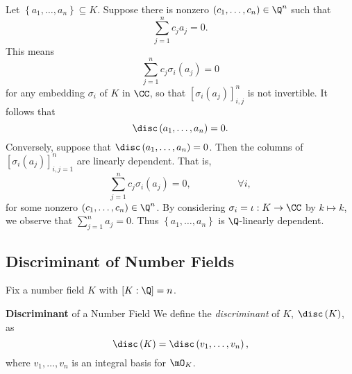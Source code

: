 \documentclass[pmath441]{subfiles}
\begin{document}
    \np Let $\left\lbrace a_1,\ldots,a_n \right\rbrace\subseteq K$. Suppose there is nonzero $\left( c_1,\ldots,c_n \right)\in\Q^n$ such that
    \begin{equation*}
        \sum^{n}_{j=1} c_ja_j = 0.
    \end{equation*}
    This means
    \begin{equation*}
        \sum^{n}_{j=1} c_j\sigma_i\left( a_j \right) = 0
    \end{equation*}
    for any embedding $\sigma_i$ of $K$ in $\CC$, so that $\left[ \sigma_i\left( a_j \right) \right]^{n}_{i,j}$ is not invertible. It follows that
    \begin{equation*}
        \disc\left( a_1,\ldots,a_n \right) = 0.
    \end{equation*}
    Conversely, suppose that $\disc\left( a_1,\ldots,a_n \right) = 0$. Then the columns of $\left[ \sigma_{i}\left( a_j \right) \right]^{n}_{i,j=1}$ are linearly dependent. That is,
    \begin{equation*}
        \sum^{n}_{j=1}c_j\sigma_i\left( a_j \right) = 0,\hspace{2cm}\forall i,
    \end{equation*}
    for some nonzero $\left( c_1,\ldots,c_n \right)\in\Q^n$. By considering $\sigma_i = \iota : K\to\CC$ by $k\mapsto k$, we observe that $\sum^{n}_{j=1} a_j = 0$. Thus $\left\lbrace a_1,\ldots,a_n \right\rbrace$ is $\Q$-linearly dependent.
    
    \subsection{Discriminant of Number Fields}

    Fix a number field $K$ with $\left[ K:\Q \right] = n$.

    \begin{definition}{\textbf{Discriminant} of a Number Field}
        We define the \emph{discriminant} of $K$, $\disc\left( K \right)$, as
        \begin{equation*}
            \disc\left( K \right) = \disc\left( v_1,\ldots,v_n \right),
        \end{equation*}
        where $v_1,\ldots,v_n$ is an integral basis for $\mO_K$.
    \end{definition}
    
\end{document}
